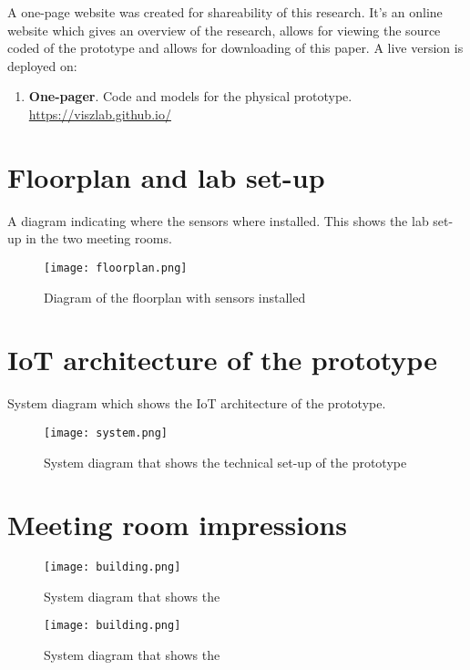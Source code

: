 \begin{appendices}
A one-page website was created for shareability of this research. It's an online website which gives an overview of the research, allows for viewing the source coded of the prototype and allows for downloading of this paper. A live version is deployed on:

\begin{enumerate}
  \item \textbf{One-pager}. Code and models for the physical prototype.\\
  \underline{https://viszlab.github.io/}
\end{enumerate}

\pagebreak

\section{Floorplan and lab set-up}
\label{appendix:floorplan}

A diagram indicating where the sensors where installed. This shows the lab set-up in the two meeting rooms.

\begin{figure}[H]
    \centering
    \texttt{[image: floorplan.png]}
    \caption{Diagram of the floorplan with sensors installed}
    \label{fig:timeline}
\end{figure}

\section{IoT architecture of the prototype}
\label{appendix:architecture}

System diagram which shows the IoT architecture of the prototype.

\begin{figure}[H]
    \centering
    \texttt{[image: system.png]}
    \caption{System diagram that shows the technical set-up of the prototype}
    \label{fig:timeline}
\end{figure}

\pagebreak

\section{Meeting room impressions}
\label{appendix:meetings}

\begin{figure}[H]
\begin{minipage}{.5\textwidth}
    \centering
    \texttt{[image: building.png]}
    \caption{System diagram that shows the }
    \label{fig:timeline}
\end{minipage}%
\begin{minipage}{.5\textwidth}
    \centering
    \texttt{[image: building.png]}
    \caption{System diagram that shows the }
    \label{fig:timeline}
\end{minipage}%
\end{figure}


\end{appendices}
